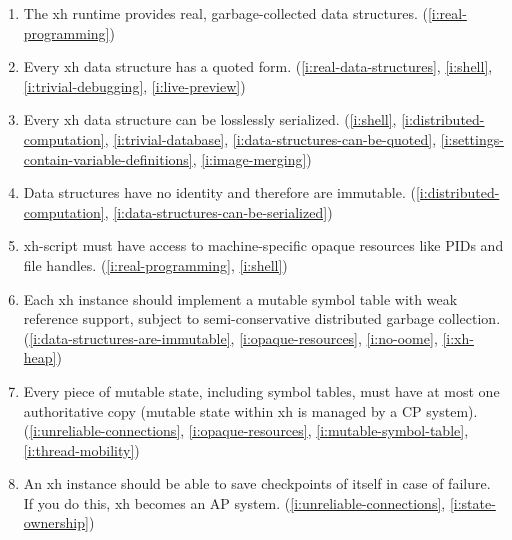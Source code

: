 \documentclass{report}
\begin{document}
\begin{enumerate}
\item{}\label{i:real-data-structures}
  The xh runtime provides real, garbage-collected data structures.
    (\ref{i:real-programming})
\item{}\label{i:data-structures-can-be-quoted}
  Every xh data structure has a quoted form.
    (\ref{i:real-data-structures},
     \ref{i:shell},
     \ref{i:trivial-debugging},
     \ref{i:live-preview})
\item{}\label{i:data-structures-can-be-serialized}
  Every xh data structure can be losslessly serialized.
    (\ref{i:shell},
     \ref{i:distributed-computation},
     \ref{i:trivial-database},
     \ref{i:data-structures-can-be-quoted},
     \ref{i:settings-contain-variable-definitions},
     \ref{i:image-merging})
\item{}\label{i:data-structures-are-immutable}
  Data structures have no identity and therefore are immutable.
    (\ref{i:distributed-computation},
     \ref{i:data-structures-can-be-serialized})

\item{}\label{i:opaque-resources}
  xh-script must have access to machine-specific opaque resources like PIDs
  and file handles.
    (\ref{i:real-programming},
     \ref{i:shell})
\item{}\label{i:mutable-symbol-table}
  Each xh instance should implement a mutable symbol table with weak
  reference support, subject to semi-conservative distributed garbage
  collection.
    (\ref{i:data-structures-are-immutable},
     \ref{i:opaque-resources},
     \ref{i:no-oome},
     \ref{i:xh-heap})
\item{}\label{i:state-ownership}
  Every piece of mutable state, including symbol tables, must have at most
  one authoritative copy (mutable state within xh is managed by a CP
  system).
    (\ref{i:unreliable-connections},
     \ref{i:opaque-resources},
     \ref{i:mutable-symbol-table},
     \ref{i:thread-mobility})
\item{}\label{i:checkpointing}
  An xh instance should be able to save checkpoints of itself in case of
  failure. If you do this, xh becomes an AP system.
    (\ref{i:unreliable-connections},
     \ref{i:state-ownership})


\end{enumerate}
\end{document}
